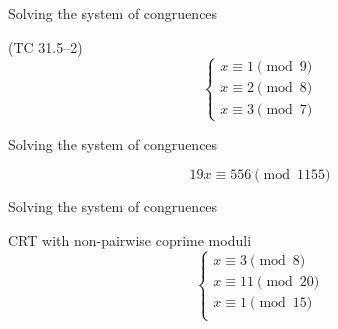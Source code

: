 \begin{frame}{Solving the system of congruences}
  \begin{exampleblock}{(TC 31.5--2)}
	\[
	  \begin{cases}
		x \equiv 1 \pmod{9} \\
		x \equiv 2 \pmod{8} \\
		x \equiv 3 \pmod{7}
	  \end{cases}
	\]
  \end{exampleblock}
\end{frame}
\begin{frame}{Solving the system of congruences}
  \begin{exampleblock}{}
	\[
	  19x \equiv 556 \pmod{1155}
	\]
  \end{exampleblock}
\end{frame}
\begin{frame}{Solving the system of congruences}
  \begin{exampleblock}{CRT with non-pairwise coprime moduli}
	\[
	  \begin{cases}
		x \equiv 3 \pmod{8} \\
		x \equiv 11 \pmod{20} \\
		x \equiv 1 \pmod{15} \\
	  \end{cases}
	\]
  \end{exampleblock}
\end{frame}
